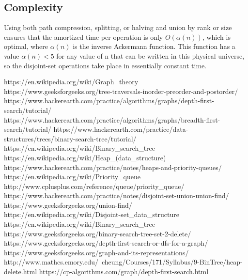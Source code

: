 \documentclass[12pt]{article}
\begin{document}
\subsection{Complexity}
Using both path compression, splitting, or halving and union by rank or size ensures that the amortized time per operation is only $\displaystyle O(\alpha (n))$,  which is optimal, where $\displaystyle \alpha (n)$ is the inverse Ackermann function. This function has a value $\displaystyle \alpha (n)<5$  for any value of n that can be written in this physical universe, so the disjoint-set operations take place in essentially constant time.
\begin{thebibliography}{9}

https://en.wikipedia.org/wiki/Graph\_theory
https://www.geeksforgeeks.org/tree-traversals-inorder-preorder-and-postorder/
https://www.hackerearth.com/practice/algorithms/graphs/depth-first-search/tutorial/
   https://www.hackerearth.com/practice/algorithms/graphs/breadth-first-search/tutorial/
   https://www.hackerearth.com/practice/data-structures/trees/binary-search-tree/tutorial/
https://en.wikipedia.org/wiki/Binary\_search\_tree
https://en.wikipedia.org/wiki/Heap\_(data\_structure)
https://www.hackerearth.com/practice/notes/heaps-and-priority-queues/
https://en.wikipedia.org/wiki/Priority\_queue
http://www.cplusplus.com/reference/queue/priority\_queue/
https://www.hackerearth.com/practice/notes/disjoint-set-union-union-find/
https://www.geeksforgeeks.org/union-find/
https://en.wikipedia.org/wiki/Disjoint-set\_data\_structure
https://en.wikipedia.org/wiki/Binary\_search\_tree
https://www.geeksforgeeks.org/binary-search-tree-set-2-delete/
https://www.geeksforgeeks.org/depth-first-search-or-dfs-for-a-graph/
https://www.geeksforgeeks.org/graph-and-its-representations/
http://www.mathcs.emory.edu/~cheung/Courses/171/Syllabus/9-BinTree/heap-delete.html
https://cp-algorithms.com/graph/depth-first-search.html
\end{thebibliography}        
\end{document}
